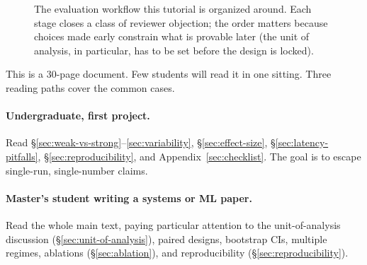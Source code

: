 \documentclass[11pt]{article}
\begin{document}
\begin{figure}[h]
    \centering
    \caption{The evaluation workflow this tutorial is organized around. Each stage closes a class of reviewer objection; the order matters because choices made early constrain what is provable later (the unit of analysis, in particular, has to be set before the design is locked).}
    \label{fig:workflow}
\end{figure}

This is a 30-page document. Few students will read it in one sitting. Three reading paths cover the common cases.

\paragraph{Undergraduate, first project.} Read \S\ref{sec:weak-vs-strong}--\ref{sec:variability}, \S\ref{sec:effect-size}, \S\ref{sec:latency-pitfalls}, \S\ref{sec:reproducibility}, and Appendix~\ref{sec:checklist}. The goal is to escape single-run, single-number claims.

\paragraph{Master's student writing a systems or ML paper.} Read the whole main text, paying particular attention to the unit-of-analysis discussion (\S\ref{sec:unit-of-analysis}), paired designs, bootstrap CIs, multiple regimes, ablations (\S\ref{sec:ablation}), and reproducibility (\S\ref{sec:reproducibility}).
\end{document}
